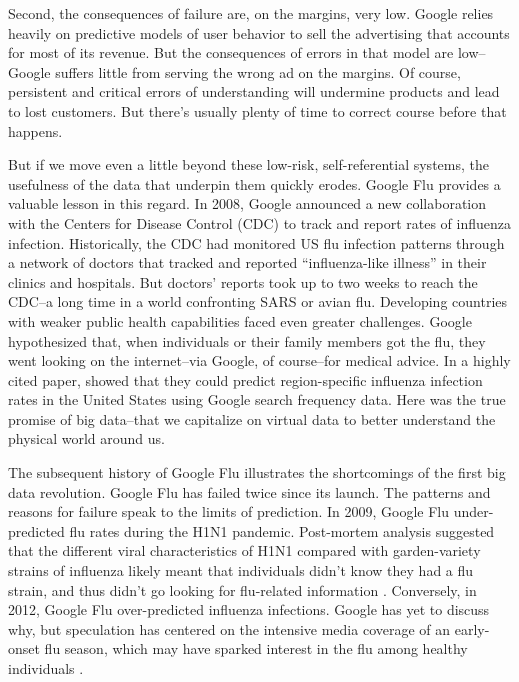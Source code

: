 \documentclass[12pt]{article}
\begin{document}
Second, the consequences of failure are, on the margins, very
low. Google relies heavily on predictive models of user behavior to
sell the advertising that accounts for most of its revenue. But the
consequences of errors in that model are low--Google suffers little
from serving the wrong ad on the margins. Of course, persistent and
critical errors of understanding will undermine products and lead to
lost customers. But there's usually plenty of time to correct course
before that happens. 

But if we move even a little beyond these low-risk, self-referential
systems, the usefulness of the data that underpin them quickly
erodes. Google Flu provides a valuable lesson in this regard. In 2008,
Google announced a new collaboration with the Centers for Disease
Control (CDC) to track and report rates of influenza
infection. Historically, the CDC had monitored US flu infection
patterns through a network of doctors that tracked and reported
``influenza-like illness'' in their clinics and hospitals. But
doctors' reports took up to two weeks to reach the CDC--a long time in
a world confronting SARS or avian flu. Developing countries with
weaker public health capabilities faced even greater
challenges. Google hypothesized that, when individuals or their family
members got the flu, they went looking on the internet--via Google, of
course--for medical advice. In a highly cited paper,
\cite{ginsberg2008detecting} showed that they could predict
region-specific influenza infection rates in the United States using
Google search frequency data. Here was the true promise of big
data--that we capitalize on virtual data to better understand the
physical world around us.

The subsequent history of Google Flu illustrates the shortcomings of
the first big data revolution. Google Flu has failed twice since its
launch. The patterns and reasons for failure speak to the limits of
prediction. In 2009, Google Flu under-predicted flu rates during the
H1N1 pandemic. Post-mortem analysis suggested that the different viral
characteristics of H1N1 compared with garden-variety strains of
influenza likely meant that individuals didn't know they had a flu
strain, and thus didn't go looking for flu-related information
\citep{cook2011assessing}. Conversely, in 2012, Google Flu
over-predicted influenza infections. Google has yet to discuss why,
but speculation has centered on the intensive media coverage of an
early-onset flu season, which may have sparked interest in the flu among
healthy individuals \citep{butler2013google}.
\end{document}
